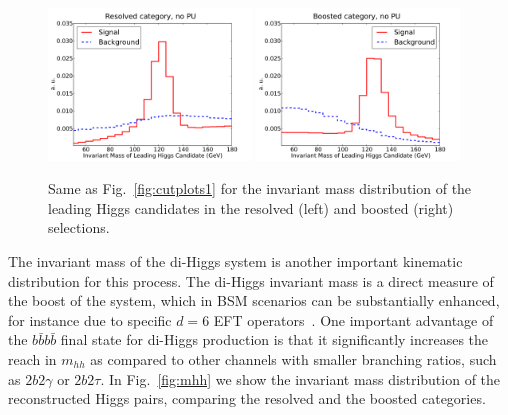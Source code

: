\begin{figure}[t]
\begin{center}
  \includegraphics[width=0.48\textwidth]{plots/m_H0_res_C1d_noPU.pdf}
  \includegraphics[width=0.48\textwidth]{plots/m_H0_bst_C1d_noPU.pdf}
  \caption{\small Same as   Fig.~\ref{fig:cutplots1} for the invariant
    mass distribution of the leading Higgs candidates in the resolved
    (left) and boosted (right) selections.
}
\label{fig:mHHinv}
\end{center}
\end{figure}

The invariant mass of the di-Higgs system is another important
kinematic distribution for this process.
%
The di-Higgs invariant mass is a direct measure of the boost of the system,
which in  BSM scenarios can be substantially
enhanced, for instance due to
specific $d=6$ EFT operators~\cite{Azatov:2015oxa}.
%
One important advantage of the $b\bar{b}b\bar{b}$ final state for
di-Higgs production is that it significantly increases the reach
in $m_{hh}$ as compared to other channels with smaller branching
ratios,
such as $2b2\gamma$ or $2b2\tau$.
%
In Fig.~\ref{fig:mhh} we show the invariant mass distribution of the
reconstructed Higgs pairs,
comparing the resolved and the boosted categories.

